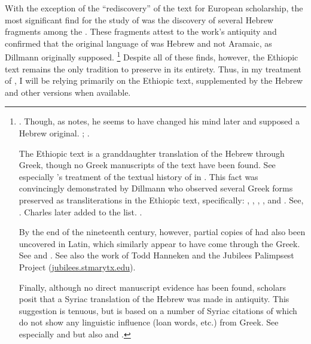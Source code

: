With the exception of the ``rediscovery'' of the text for European scholarship, the most significant find for the study of \jub was the discovery of several Hebrew fragments among the \dss. These fragments  attest to the work's antiquity and confirmed that the original language of \jub was Hebrew and not Aramaic, as Dillmann originally supposed.%
        \footnote{\cite[90]{dillamnn_jbw1850}. Though, as \vanderkam notes, he seems to have changed his mind later and supposed a Hebrew original. \cite[324]{dillmann_spaw1883}; \cite[1:1 n. 1]{vanderkam2018}.

        The Ethiopic text is a granddaughter translation of the Hebrew through Greek, though no Greek manuscripts of the text have been found. See especially \vanderkam's treatment of the textual history of \jub in \cite*[1--18]{vanderkam1977}. This fact was convincingly demonstrated by Dillmann who observed several Greek forms preserved as transliterations in the Ethiopic text, specifically: , , , , and . See, \cite[88]{dillamnn_jbw1850}. Charles later added  to the list. \cite[xxx]{charles1902}.

        By the end of the nineteenth century, however, partial copies of \jub had also been uncovered in Latin, which similarly appear to have come through the Greek.
        See
                \cite[15--54]{ceriani1861} and
                \cite{ronsch1874}.
        See also the work of Todd Hanneken and the Jubilees Palimpsest Project (\href{http://jubilees.stmarytx.edu}{jubilees.stmarytx.edu}).

        Finally, although no direct manuscript evidence has been found, \jub scholars posit that a Syriac translation of the Hebrew was made in antiquity. This suggestion is tenuous, but is based on a number of Syriac citations of \jub which do not show any linguistic influence (loan words, etc.) from Greek.
        See especially
                \cite[231--232]{tisserant_rb1921} and 
                \cite[xxix]{charles1902} but also 
                \cite[2:ix--x]{ceriani1861} and 
                \cite[x]{charles1895}.}
Despite all of these finds, however, the Ethiopic text remains the only tradition to preserve \jub in its entirety. Thus, in my treatment of \jub, I will be relying primarily on the Ethiopic text, supplemented by the Hebrew and other versions when available.

